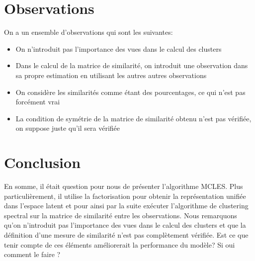 \documentclass[12pt, french, latin.medieval, a4paper]{report}
\begin{document}
    \section{Observations}
    On a un ensemble d'observations qui sont les suivantes:
    \begin{itemize}
   	 \item On n'introduit pas l'importance des vues dans le calcul des clusters
   	 \item Dans le calcul de la matrice de similarité, on introduit une observation dans sa propre estimation en utilisant les autres autres observations
   	 \item On considère les similarités comme étant des pourcentages, ce qui n'est pas forcément vrai
   	 \item La condition de symétrie de la matrice de similarité obtenu n'est pas vérifiée, on suppose juste qu'il sera vérifiée
    \end{itemize}

	\section{Conclusion}
    En somme, il était question pour nous de présenter l'algorithme MCLES.
    Plus particulièrement, il utilise la factorisation pour obtenir la représentation unifiée dans l'espace latent et pour ainsi par la suite exécuter l'algorithme de clustering spectral sur la matrice de similarité entre les observations.
    Nous remarquons qu'on n'introduit pas l'importance des vues dans le calcul des clusters et que la définition d'une mesure de similarité n'est pas complètement vérifiée.
    Est ce que tenir compte de ces éléments améliorerait la performance du modèle? Si oui comment le faire ?
   

	
\end{document}
